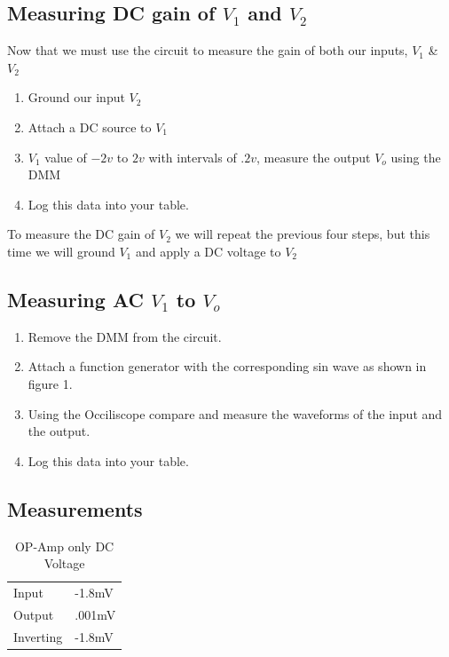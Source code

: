 \documentclass[12pt]{article}
\begin{document}
\subsection{Measuring DC gain of $V_1$ and $V_2$}

Now that we must use the circuit to measure the gain of both our inputs, $V_1$ \& $V_2$ 
\begin{enumerate}
	\item Ground our input $V_2$
	\item Attach a DC source to $V_1$
	\item $V_1$ value of $-2v$ to $2v$ with intervals of $.2v$, measure the output $V_o$ using the DMM
	\item Log this data into your table.
	
\end{enumerate}

To measure the DC gain of $V_2$ we will repeat the previous four steps, but this time we will ground $V_1$ and apply a DC voltage to $V_2$

\subsection{Measuring AC $V_1$ to $V_o$}

\begin{enumerate}
	\item Remove the DMM from the circuit.
	\item Attach a function generator with the corresponding sin wave as shown in figure 1.
	\item Using the Occiliscope compare and measure the waveforms of the input and the output.
	\item Log this data into your table.
	
\end{enumerate}
\newpage
\subsection{Measurements}

\begin{table}[!h]
	\centering
	\caption{OP-Amp only DC Voltage}
	\label{my-label}
	\begin{tabular}{ll}
		Input     & -1.8mV \\
		Output    & .001mV \\
		Inverting & -1.8mV
	\end{tabular}
\end{table}
\end{document}
